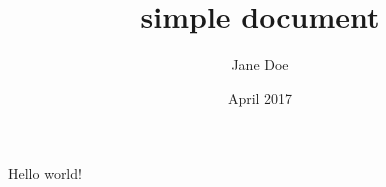 \documentclass{article}
\title{simple document}
\author{Jane Doe}
\date{April 2017}
\begin{document}
   \maketitle
   Hello world!
\end{document}
